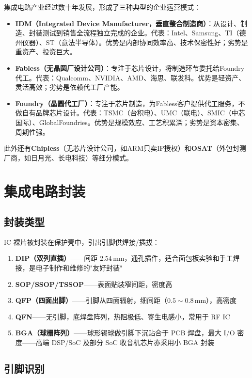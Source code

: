 \documentclass[12pt,UTF8]{ctexbook}
\begin{document}
集成电路产业经过数十年发展，形成了三种典型的企业运营模式：

\begin{itemize}[leftmargin=2cm]
\item \textbf{IDM（Integrated Device Manufacturer，垂直整合制造商）}：从设计、制造、封装测试到销售全流程独立完成的企业。代表：Intel、Samsung、TI（德州仪器）、ST（意法半导体）。优势是内部协同效率高、技术保密性好；劣势是重资产、投资巨大。
\item \textbf{Fabless（无晶圆厂设计公司）}：专注于芯片设计，将制造环节委托给Foundry代工。代表：Qualcomm、NVIDIA、AMD、海思、联发科。优势是轻资产、灵活高效；劣势是依赖代工厂产能。
\item \textbf{Foundry（晶圆代工厂）}：专注于芯片制造，为Fabless客户提供代工服务，不做自有品牌芯片设计。代表：TSMC（台积电）、UMC（联电）、SMIC（中芯国际）、GlobalFoundries。优势是规模效应、工艺积累深；劣势是资本密集、周期性强。
\end{itemize}

此外还有\textbf{Chipless}（无芯片设计公司，如ARM只卖IP授权）和\textbf{OSAT}（外包封测厂商，如日月光、长电科技）等细分模式。

\section{集成电路封装}
\label{sec:ic_package}

\subsection{封装类型}

IC 裸片被封装在保护壳中，引出引脚供焊接/插拔：
\begin{enumerate}
\item \textbf{DIP（双列直插）}——间距 $2.54\,\mathrm{mm}$，通孔插件，适合面包板实验和手工焊接，是电子制作和维修的"友好封装"
\item \textbf{SOP/SSOP/TSSOP}——表面贴装窄间距，密度高
\item \textbf{QFP（四面出脚）}——引脚从四面辐射，细间距（$0.5\sim0.8\,\mathrm{mm}$），高密度
\item \textbf{QFN}——无引脚，底焊盘阵列，热阻极低、寄生电感小，常用于 RF IC
\item \textbf{BGA（球栅阵列）}——球形锡球做引脚下沉贴合于 PCB 焊盘，最大 I/O 密度——高端 DSP/SoC 及部分 SoC 收音机芯片亦采用小 BGA 封装
\end{enumerate}

\subsection{引脚识别}
\end{document}

